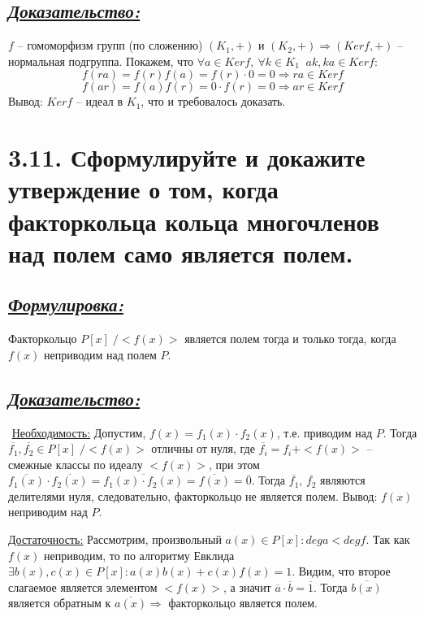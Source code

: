 \documentclass{article}
\begin{document}
\subsection*{\Large \underline{\textit{Доказательство: }}}
$f$ -- гомоморфизм групп (по сложению) $(K_1, +)$ и $(K_2, +) \Rightarrow (Kerf, +)$ -- нормальная подгруппа. Покажем, что $\forall a \in Kerf,\: \forall k \in K_1 \;\; ak, ka \in Kerf$:
$$f(ra) = f(r)f(a) = f(r)\cdot 0 = 0 \Rightarrow ra \in Kerf$$
$$f(ar) = f(a)f(r) = 0\cdot f(r) = 0 \Rightarrow ar \in Kerf$$
Вывод: $Kerf$ -- идеал в $K_1$, что и требовалось доказать.

\section*{\LARGE 3.11. Сформулируйте и докажите утверждение о том, когда факторкольца кольца многочленов над полем само является полем. }
\subsection*{\Large \underline{\textit{Формулировка: }}}
Факторкольцо $P[x] \;/ <f(x)>$ является полем тогда и только тогда, когда $f(x)$ неприводим над полем $P$.

\subsection*{\Large \underline{\textit{Доказательство: }}}
$ $ \indent \underline{Необходимость:}
\newline Допустим, $f(x) = f_1(x) \cdot f_2(x)$, т.е. приводим над $P$. Тогда 
\newline $\overline{f_1}, \overline{f_2} \in P[x] \;/ <f(x)>$ отличны от нуля, где $\overline{f_i} = f_i + <f(x)>$ -- смежные классы по идеалу $<f(x)>$, при этом $\overline{f_1(x)}\cdot \overline{f_2(x)} = \overline{f_1(x) \cdot f_2(x)} = \overline{f(x)} = \overline{0}$. Тогда $\overline{f_1},\, \overline{f_2}$ являются делителями нуля, следовательно, факторкольцо не является полем. Вывод: $f(x)$ неприводим над $P$.

\underline{Достаточность:}
\newline Рассмотрим, произвольный $a(x) \in P[x] : dega < degf$. Так как $f(x)$ неприводим, то по алгоритму Евклида $\exists b(x), c(x) \in P[x] : a(x) b(x) + c(x) f(x) = 1$. Видим, что второе слагаемое является элементом $<f(x)>$, а значит $\overline{a}\cdot \overline{b} = \overline{1}$. Тогда $\overline{b(x)}$ является обратным к $\overline{a(x)} \Rightarrow$ факторкольцо является полем. 
\end{document}
